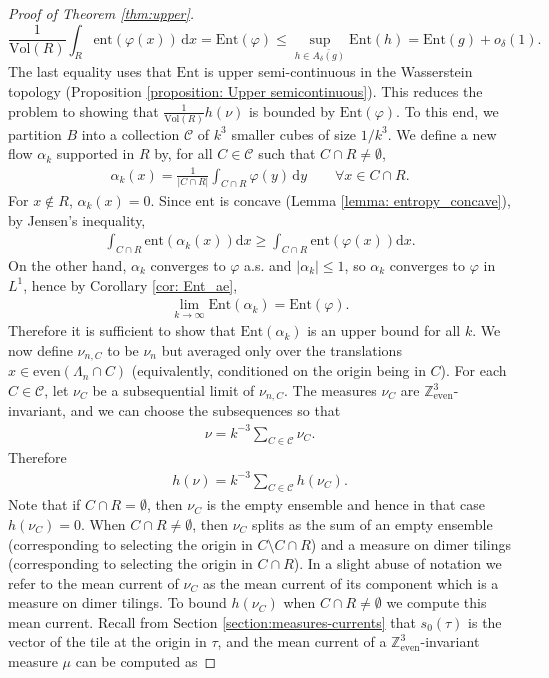 \documentclass[11pt]{article}
\theoremstyle{remark}
\theoremstyle{definition}
\newcommand{\Z}{\mathbb{Z}}
\newcommand{\ent}{\text{ent}}
\newcommand{\Ent}{\text{Ent}}
\newcommand{\threeeven}{\Z^3_{\text{even}}}
\newcommand{\mc}[1]{\mathcal{#1}}
\newcommand{\Vol}{\text{Vol}}
\newcommand{\dd}{\mathrm{d}}
\begin{document}
\begin{proof}[Proof of Theorem \ref{thm:upper}]
$$\frac{1}{\Vol(R)} \int_{R} \ent(\varphi(x)) \, \dd x = \Ent(\varphi) \leq \sup_{h\in \overline{A_\delta(g)}} \Ent(h) = \Ent(g) + o_\delta(1).$$
The last equality uses that $\Ent$ is upper semi-continuous in the Wasserstein topology (Proposition \ref{proposition: Upper semicontinuous}). This reduces the problem to showing that $\frac{1}{\Vol(R)} h(\nu)$ is bounded by $\Ent(\varphi)$. To this end, we partition $B$ into a collection $\mc C$ of $k^3$ smaller cubes of size $1/k^3$. We define a new flow $\alpha_k$ supported in $R$ by, for all $C\in \mc C$ such that $C\cap R\neq \emptyset$, 
\begin{align*}
    \alpha_k(x) = \frac{1}{|C\cap R|} \int_{C\cap R} \varphi(y) \, \dd y \qquad \forall x\in C\cap R.
\end{align*}
For $x\not\in R$, $\alpha_k(x) = 0$. Since $\ent$ is concave (Lemma \ref{lemma: entropy_concave}), by Jensen's inequality, 
\begin{align*}
    \int_{C\cap R} \ent(\alpha_k(x)) \dd x \geq \int_{C\cap R} \ent(\varphi(x)) \dd x.
\end{align*}
On the other hand, $\alpha_k$ converges to $\varphi$ a.s. and $|\alpha_k|\leq 1$, so $\alpha_k$ converges to $\varphi$ in $L^1$, hence by Corollary \ref{cor: Ent_ae},
\begin{align*}
    \lim_{k\to\infty} \Ent(\alpha_k) = \Ent(\varphi). 
\end{align*}
Therefore it is sufficient to show that $\Ent(\alpha_k)$ is an upper bound for all $k$. We now define $\nu_{n,C}$ to be $\nu_{n}$ but averaged only over the translations $x\in \text{even}(\Lambda_n\cap C)$ (equivalently, conditioned on the origin being in $C$). For each $C\in \mc C$, let $\nu_C$ be a subsequential limit of $\nu_{n,C}$. The measures $\nu_C$ are $\threeeven$-invariant, and we can choose the subsequences so that 
\begin{align*}
    \nu = k^{-3} \sum_{C\in \mc C} \nu_C.
\end{align*}
Therefore 
\begin{align*}
    h(\nu) = k^{-3} \sum_{C\in \mc C} h(\nu_C). 
\end{align*}
Note that if $C\cap R = \emptyset$, then $\nu_C$ is the empty ensemble and hence in that case $h(\nu_C)=0$. When $C\cap R\neq \emptyset$, then $\nu_C$ splits as the sum of an empty ensemble (corresponding to selecting the origin in $C\setminus C\cap R$) and a measure on dimer tilings (corresponding to selecting the origin in $C\cap R$). In a slight abuse of notation we refer to the mean current of $\nu_C$ as the mean current of its component which is a measure on dimer tilings. To bound $h(\nu_C)$ when $C\cap R\neq \emptyset$ we compute this mean current. Recall from Section \ref{section:measures-currents} that $s_0(\tau)$ is the vector of the tile at the origin in $\tau$, and the mean current of a $\threeeven$-invariant measure $\mu$ can be computed as

\end{proof}
\end{document}
